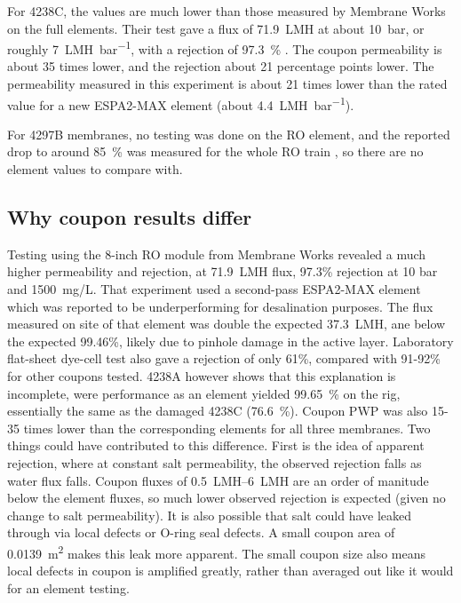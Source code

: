 For 4238C, the values are much lower than those measured by Membrane Works on the full elements. Their test gave a flux of \qty{71.9}{LMH} at about \qty{10}{bar}, or roughly \qty{7}{LMH.bar^{-1}}, with a rejection of \qty{97.3}{\percent} \citep{MembraneWorks2025Desal}. The coupon permeability is about 35 times lower, and the rejection about 21 percentage points lower. The permeability measured in this experiment is about 21 times lower than the rated value for a new ESPA2-MAX element (about \qty{4.4}{LMH.bar^{-1}}). 

For 4297B membranes, no testing was done on the RO element, and the reported drop to around \qty{85}{\percent} was measured for the whole RO train \citep{MembraneWorks2026Mine}, so there are no element values to compare with. 

\subsection{Why coupon results differ}
Testing using the 8-inch RO module from Membrane Works revealed a much higher permeability and rejection, at \qty{71.9}{LMH} flux, 97.3\% rejection at 10 bar and \qty{1500}{mg/L}. That experiment used a second-pass ESPA2-MAX element which was reported to be underperforming for desalination purposes. The flux measured on site of that element was double the expected \qty{37.3}{LMH}, ane below the expected 99.46\%, likely due to pinhole damage in the active layer. Laboratory flat-sheet dye-cell test also gave a rejection of only 61\%, compared with 91-92\% for other coupons tested.
4238A however shows that this explanation is incomplete, were performance as an element yielded \qty{99.65}{\percent} on the rig, essentially the same as the damaged 4238C (\qty{76.6}{\percent}). Coupon PWP was also 15-35 times lower than the corresponding elements for all three membranes. Two things could have contributed to this difference. First is the idea of apparent rejection, where at constant salt permeability, the observed rejection falls as water flux falls. Coupon fluxes of \qtyrange{0.5}{6}{LMH} are an order of manitude below the element fluxes, so much lower observed rejection is expected (given no change to salt permeability). It is also possible that salt could have leaked through via local defects or O-ring seal defects. A small coupon area of \qty{0.0139}{m^2} makes this leak more apparent. The small coupon size also means local defects in coupon is amplified greatly, rather than averaged out like it would for an element testing. 

